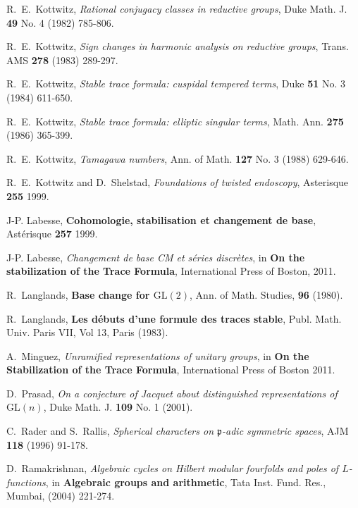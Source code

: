 \documentclass[12pt]{amsart}
\theoremstyle{remark}
\numberwithin{equation}{section}
\newcommand{\GL}{\mathrm{GL}}
\newcommand{\pp}{\mathfrak{p}}
\newcommand{\quash}[1]{}
\theoremstyle{definition}
\numberwithin{equation}{subsection}
\begin{document}
\begin{thebibliography}{}
\quash{\bibitem[JY]{JY} H.~Jacquet and Y.~Ye, \emph{Distinguished representations and quadratic base change for $\GL(3)$} PAMS, {\bf 348} No. 3 (1996) 913-939.}

 R.~E.~Kottwitz, \emph{Rational conjugacy
classes in reductive groups}, Duke Math. J. {\bf 49} No. 4 (1982) 785-806.

 R.~E.~Kottwitz, \emph{Sign changes in
harmonic analysis on reductive groups}, Trans. AMS {\bf 278} (1983)
289-297.

 R.~E.~Kottwitz, \emph{Stable trace formula:
cuspidal tempered terms}, Duke {\bf 51} No. 3 (1984) 611-650.

 R.~E.~Kottwitz, \emph{Stable trace
formula: elliptic singular terms}, Math. Ann. {\bf 275} (1986)
365-399.

 R.~E.~Kottwitz, \emph{Tamagawa numbers}, Ann. of Math. {\bf 127}
No. 3 (1988) 629-646.

 R.~E.~Kottwitz and D.~Shelstad, \emph{Foundations of twisted endoscopy}, Asterisque {\bf 255} 1999.

 J-P. Labesse, \textbf{Cohomologie, stabilisation et
changement de base}, Ast\'erisque {\bf 257} 1999.

 J-P. Labesse, \emph{Changement de base CM et s\'eries discr\`etes}, in \textbf{On the stabilization of the Trace Formula}, International Press of Boston, 2011.

 R.~Langlands, \textbf{Base change for $\GL(2)$}, Ann. of Math. Studies, {\bf 96} (1980).

 R.~Langlands, \textbf{Les d\'ebuts d'une
formule des traces stable}, Publ. Math. Univ. Paris VII, Vol 13,
Paris (1983).

 A.~Minguez, \emph{Unramified representations of unitary groups}, in \textbf{On the Stabilization of the Trace Formula}, International Press of Boston 2011.


 D.~Prasad, \emph{On a conjecture of Jacquet about distinguished representations of
$\GL(n)$}, Duke Math. J. {\bf 109} No. 1 (2001).

 C.~Rader and S.~Rallis, \emph{Spherical characters on $\pp$-adic symmetric spaces}, AJM {\bf 118} (1996) 91-178.

 D.~Ramakrishnan, \emph{Algebraic cycles on Hilbert modular fourfolds and poles of $L$-functions},
in \textbf{Algebraic groups and arithmetic}, Tata Inst. Fund. Res., Mumbai, (2004) 221-274.



\end{thebibliography}
\end{document}
